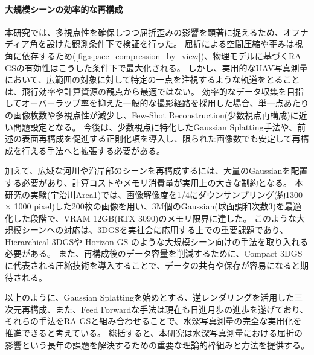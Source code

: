 \paragraph{大規模シーンの効率的な再構成}\label{subsec:large-scale-reconstruction}


本研究では、多視点性を確保しつつ屈折歪みの影響を顕著に捉えるため、オフナディア角を設けた観測条件下で検証を行った。
屈折による空間圧縮や歪みは視角に依存するため(\cref{fig:space_compression_by_view})、物理モデルに基づくRA-GSの有効性はこうした条件下で最大化される。
しかし、実用的なUAV写真測量において、広範囲の対象に対して特定の一点を注視するような軌道をとることは、飛行効率や計算資源の観点から最適ではない。
効率的なデータ収集を目指してオーバーラップ率を抑えた一般的な撮影経路を採用した場合、単一点あたりの画像枚数や多視点性が減少し、Few-Shot Reconstruction(少数視点再構成)に近い問題設定となる。
今後は、少数視点に特化したGaussian Splatting手法\cite{Guedon2025CVPR_MatChaGaussians}や、前述の表面再構成を促進する正則化項を導入し、限られた画像数でも安定して再構成を行える手法へと拡張する必要がある。

加えて、広域な河川や沿岸部のシーンを再構成するには、大量のGaussianを配置する必要があり、計算コストやメモリ消費量が実用上の大きな制約となる。
本研究の実験(宇治川Area1)では、画像解像度を1/4にダウンサンプリング(約1300 $\times$ 1000 pixel)した200枚の画像を用い、3M個のGaussian(球面調和次数3)を最適化した段階で、VRAM 12GB(RTX 3090)のメモリ限界に達した。
このような大規模シーンへの対応は、3DGSを実社会に応用する上での重要課題であり、Hierarchical-3DGS\cite{Kerbl2024ToG_Hierarchical3DGS}や Horizon-GS \cite{Jiang2025CVPR_Horizon-GS} のような大規模シーン向けの手法を取り入れる必要がある。
また、再構成後のデータ容量を削減するために、Compact 3DGS\cite{Lee2024CVPR_Compact3DGS}に代表される圧縮技術を導入することで、データの共有や保存が容易になると期待される。

\vspace{1em}

以上のように、Gaussian Splattingを始めとする、逆レンダリングを活用した三次元再構成、また、Feed Forwardな手法は現在も日進月歩の進歩を遂げており、それらの手法をRA-GSと組み合わせることで、水深写真測量の完全な実用化を推進できると考えている。
総括すると、本研究は水深写真測量における屈折の影響という長年の課題を解決するための重要な理論的枠組みと方法を提供する。


